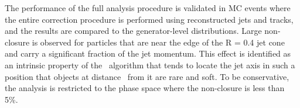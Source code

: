 The performance of the full analysis procedure is validated in MC events where the entire correction procedure is performed using reconstructed jets and tracks, and the results are compared to the generator-level distributions. Large non-closure is observed for particles that are near the edge of the R = 0.4 jet cone and carry a significant fraction of the jet momentum. This effect is identified as an intrinsic property of the \antikt\ algorithm that tends to locate the jet axis in such a position that objects at distance \rvar\ from it are rare and soft. To be conservative, the analysis is restricted to the phase space where the non-closure is less than 5\%.

